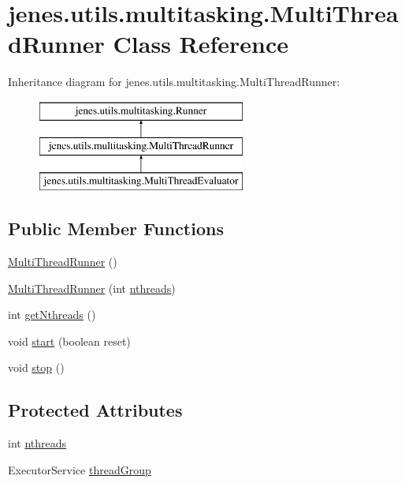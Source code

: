 \hypertarget{classjenes_1_1utils_1_1multitasking_1_1_multi_thread_runner}{\section{jenes.\-utils.\-multitasking.\-Multi\-Thread\-Runner Class Reference}
\label{classjenes_1_1utils_1_1multitasking_1_1_multi_thread_runner}
}
Inheritance diagram for jenes.\-utils.\-multitasking.\-Multi\-Thread\-Runner\-:\begin{figure}[H]
\begin{center}
\leavevmode
\includegraphics[height=3.000000cm]{classjenes_1_1utils_1_1multitasking_1_1_multi_thread_runner}
\end{center}
\end{figure}
\subsection*{Public Member Functions}
\begin{DoxyCompactItemize}
\item 
\hyperlink{classjenes_1_1utils_1_1multitasking_1_1_multi_thread_runner_ab0815486f3159f086cd06ccab94df319}{Multi\-Thread\-Runner} ()
\item 
\hyperlink{classjenes_1_1utils_1_1multitasking_1_1_multi_thread_runner_a6319362b08c06d8bf26989407d223c31}{Multi\-Thread\-Runner} (int \hyperlink{classjenes_1_1utils_1_1multitasking_1_1_multi_thread_runner_aa20fe700a6b2abd3694b4a1d5629db8f}{nthreads})
\item 
int \hyperlink{classjenes_1_1utils_1_1multitasking_1_1_multi_thread_runner_a69370630a898026070fe8e806cec8fe0}{get\-Nthreads} ()
\item 
void \hyperlink{classjenes_1_1utils_1_1multitasking_1_1_multi_thread_runner_a52fc59a28c3187e84b871b9b823b7f43}{start} (boolean reset)
\item 
void \hyperlink{classjenes_1_1utils_1_1multitasking_1_1_multi_thread_runner_a5f00a9b63ff1322d586ad62ec060d597}{stop} ()
\end{DoxyCompactItemize}
\subsection*{Protected Attributes}
\begin{DoxyCompactItemize}
\item 
int \hyperlink{classjenes_1_1utils_1_1multitasking_1_1_multi_thread_runner_aa20fe700a6b2abd3694b4a1d5629db8f}{nthreads}
\item 
Executor\-Service \hyperlink{classjenes_1_1utils_1_1multitasking_1_1_multi_thread_runner_afd9939cc7a261bd4bb6c8f3de6f58337}{thread\-Group}
\end{DoxyCompactItemize}


